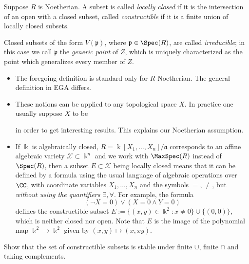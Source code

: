 \begin{definition}
	Suppose $R$ is Noetherian. A subset is called \emph{locally closed} if it is the intersection of an open with a closed subset, called \emph{constructible} if it is a finite union of locally closed subsets. %

	Closed subsets of the form $V(\mathfrak{p})$, where $\mathfrak{p} \in \Spec(R)$, are called \emph{irreducible}; in this case we call $\mathfrak{p}$ the \emph{generic point} of $Z$, which is uniquely characterized as the point which generalizes every member of $Z$.
\end{definition}
\begin{itemize}
	\item The foregoing definition is standard only for $R$ Noetherian. The general definition in EGA differs.
	\item These notions can be applied to any topological space $X$. In practice one usually suppose $X$ to be
		in order to get interesting results. This explains our Noetherian assumption.
	\item If $\Bbbk$ is algebraically closed, $R = \Bbbk[X_1, \ldots, X_n]/\mathfrak{a}$ corresponds to an affine algebraic variety $\mathcal{X} \subset \Bbbk^n$ and we work with $\MaxSpec(R)$ instead of $\Spec(R)$, then a subset $E \subset \mathcal{X}$ being locally closed means that it can be defined by a formula using the usual language of algebraic operations over $\CC$, with coordinate variables $X_1, \ldots, X_n$  and the symbols $=, \neq$, but \emph{without using the quantifiers $\exists, \forall$}. For example, the formula
	\[ (\neg X = 0) \vee (X = 0 \wedge Y=0) \]
	defines the constructible subset $E := \{(x,y) \in \Bbbk^2 : x \neq 0 \} \cup \{(0,0) \}$, which is neither closed nor open. Note that $E$ is the image of the polynomial map $\Bbbk^2 \to \Bbbk^2$ given by $(x,y) \mapsto (x,xy)$.
\end{itemize}

\begin{exercise}
	Show that the set of constructible subsets is stable under finite $\cup$, finite $\cap$ and taking complements.
\end{exercise}

